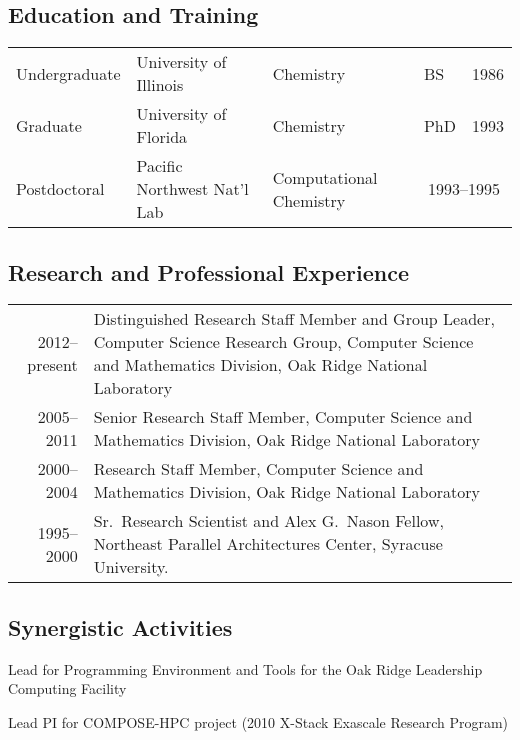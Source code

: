 
\subsection*{Education and Training}
\begin{tabular}{llllr}
Undergraduate & University of Illinois & Chemistry & BS & 1986 \\
Graduate & University of Florida & Chemistry & PhD & 1993 \\
Postdoctoral & Pacific Northwest Nat'l Lab & Computational Chemistry &
\multicolumn{2}{c}{1993--1995}
\end{tabular}


\subsection*{Research and Professional Experience}
\begin{tabular}{rp{5in}}

2012--present & Distinguished Research Staff Member and Group Leader,
Computer Science Research Group, Computer Science and Mathematics
Division, Oak Ridge National Laboratory \\
2005--2011 & Senior Research Staff Member, Computer Science and
Mathematics Division, Oak Ridge National Laboratory \\
2000--2004 & Research Staff Member, Computer Science and Mathematics
Division, Oak Ridge National Laboratory \\
1995--2000 & Sr.~Research Scientist and Alex G.~Nason Fellow,
Northeast Parallel Architectures Center, Syracuse University.
\end{tabular}


\subsection*{Synergistic Activities}
\begin{list}{}{\topsep -1pt \itemsep -1pt \parsep -1pt}

\item Lead for Programming Environment and Tools for the 
Oak Ridge Leadership Computing Facility

\item Lead PI for COMPOSE-HPC project (2010 X-Stack Exascale Research Program)


\end{list}

